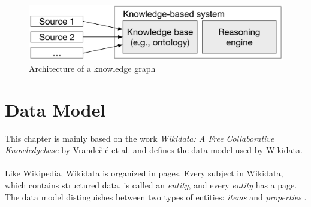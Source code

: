 ﻿\documentclass[11pt,titlepage,oneside,openany]{book}
\begin{document}
\begin{figure}
	\begin{center}
	\includegraphics[width=13cm]{./figures/knowledge-graph-architecture.png}
	\caption[Architecture of a knowledge graph]{Architecture of a knowledge graph \cite{TDKG01}}
	\label{fig:knowledge-graph-architecture}
	\end{center}
\end{figure}

\chapter{Data Model}
\label{chap:wikidata}
This chapter is mainly based on the work \textit{Wikidata: A Free Collaborative Knowledgebase} \cite{AFCK01} by Vrandečić et al. and defines the data model used by Wikidata.
\\
\\
Like Wikipedia, Wikidata is organized in pages. Every subject in Wikidata, which contains structured data, is called an \textit{entity}, and every \textit{entity} has a page. The data model distinguishes between two types of entities: \textit{items} and \textit{properties} \cite{Erxleben2014IntroducingWT}.
\\
\\
\end{document}

